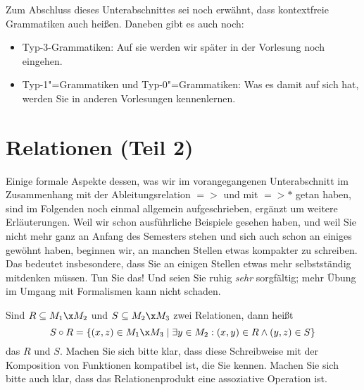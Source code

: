Zum Abschluss dieses Unterabschnittes sei noch erwähnt, dass
kontextfreie Grammatiken auch
 heißen.  Daneben
gibt es auch noch:
\begin{itemize}
\item Typ-3-Grammatiken: Auf sie werden wir später in der Vorlesung
  noch eingehen.
\item Typ-1"=Grammatiken und Typ-0"=Grammatiken: Was es damit auf sich
  hat, werden Sie in anderen Vorlesungen kennenlernen.
\end{itemize}

\Tut\section{Relationen (Teil 2)}
\label{subsec:relationen-2}

Einige formale Aspekte dessen, was wir im vorangegangenen
Unterabschnitt im Zusammenhang mit der Ableitungsrelation $=>$ und mit
$=>*$ getan haben, sind im Folgenden noch einmal allgemein
aufgeschrieben, ergänzt um weitere Erläuterungen. Weil wir schon
ausführliche Beispiele gesehen haben, und weil Sie nicht mehr ganz an
Anfang des Semesters stehen und sich auch schon an einiges gewöhnt
haben, beginnen wir, an manchen Stellen etwas kompakter zu schreiben.
Das bedeutet insbesondere, dass Sie an einigen Stellen etwas mehr
selbstständig mitdenken müssen. Tun Sie das! Und seien Sie ruhig
\emph{sehr} sorgfältig; mehr Übung im Umgang mit Formalismen kann
nicht schaden.

Sind $R\subseteq M_1\x M_2$ und $S\subseteq M_2\x M_3$ zwei
Relationen, dann heißt
\[
S\circ R = \{ (x,z)\in M_1\x M_3 \mid \exists y\in M_2: (x,y)\in R \land (y,z)\in S \}
\]
das 
$R$ und $S$. Machen Sie sich bitte klar, dass diese Schreibweise mit
der Komposition von Funktionen kompatibel ist, die Sie kennen.  Machen
Sie sich bitte auch klar, dass das Relationenprodukt eine assoziative
Operation ist.

